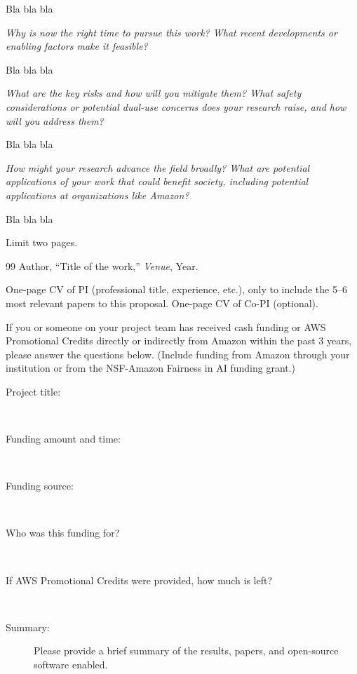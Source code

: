 \documentclass[11pt]{ara-proposal}
\begin{document}
Bla bla bla

\emph{Why is now the right time to pursue this work? What recent developments or enabling factors make it feasible?}

Bla bla bla

\emph{What are the key risks and how will you mitigate them? What safety considerations or potential dual-use concerns does your research raise, and how will you address them?}

Bla bla bla

\emph{How might your research advance the field broadly? What are potential applications of your work that could benefit society, including potential applications at organizations like Amazon?}

Bla bla bla

\appendix

Limit two pages.

\begin{thebibliography}{99}
 Author, ``Title of the work,'' \emph{Venue}, Year.
\end{thebibliography}

One-page CV of PI (professional title, experience, etc.), only to include the 5--6
most relevant papers to this proposal. One-page CV of Co-PI (optional).

If you or someone on your project team has received cash funding or AWS Promotional
Credits directly or indirectly from Amazon within the past 3 years, please answer
the questions below. (Include funding from Amazon through your institution or from
the NSF-Amazon Fairness in AI funding grant.)

\begin{description}
  \item[Project title:]~\\
  \item[Funding amount and time:]~\\
  \item[Funding source:]~\\
  \item[Who was this funding for?]~\\
  \item[If AWS Promotional Credits were provided, how much is left?]~\\
  \item[Summary:] Please provide a brief summary of the results, papers, and
    open-source software enabled.
\end{description}
\end{document}
